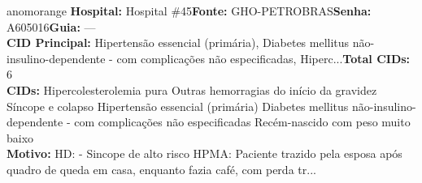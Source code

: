 \documentclass[a4paper,10pt]{article}
\begin{document}
\begin{anomalycard}[Interna\c{c}\~{a}o \#167960 | Pac. \#87587 | ALTO (z=3.12) | LOS: 16d | 07/03/2026\,$\to$\,—]{anomorange}
\textbf{Hospital:} Hospital \#45\quad \textbf{Fonte:} GHO-PETROBRAS\quad \textbf{Senha:} A605016\quad \textbf{Guia:} ---\\

\textbf{CID Principal:} {\small Hipertensão essencial (primária), Diabetes mellitus não-insulino-dependente - com complicações não especificadas, Hiperc...}\quad\textbf{Total CIDs:} 6\\

\textbf{CIDs:} {\scriptsize Hipercolesterolemia pura \textbar{} Outras hemorragias do início da gravidez \textbar{} Síncope e colapso \textbar{} Hipertensão essencial (primária) \textbar{} Diabetes mellitus não-insulino-dependente - com complicações não especificadas \textbar{} Recém-nascido com peso muito baixo}\\

\textbf{Motivo:} {\scriptsize HD: - Sincope de alto risco  HPMA: Paciente trazido pela esposa após quadro de queda em casa, enquanto fazia café, com perda tr...}\\




\end{anomalycard}
\end{document}
